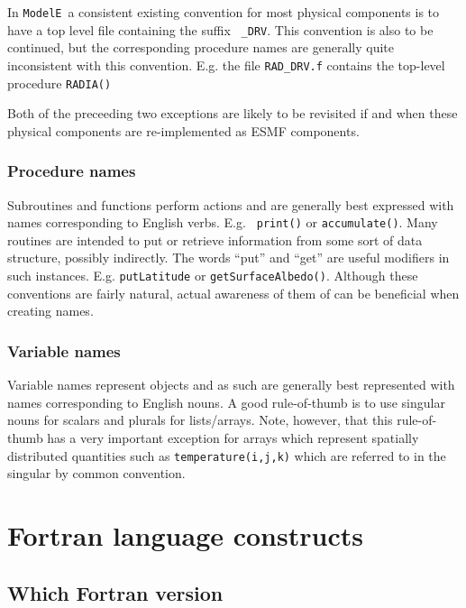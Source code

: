 \documentclass{article}
\newcommand{\ModelE}{{\tt ModelE}}
\begin{document}
In \ModelE~a consistent existing convention for most physical
components is to have a top level file containing the suffix {\tt
  \_DRV}.  This convention is also to be continued, but the
corresponding procedure names are generally quite inconsistent with
this convention.  E.g. the file {\tt RAD\_DRV.f} contains the top-level
procedure {\tt RADIA()}

Both of the preceeding two exceptions are likely to be revisited if
and when these physical components are re-implemented as ESMF
components.


\subsubsection {Procedure names}
Subroutines and functions perform actions and are generally best
expressed with names corresponding to English verbs.  E.g. {\tt
  print()} or {\tt accumulate()}.  Many routines are intended to put
or retrieve information from some sort of data structure, possibly
indirectly.  The words ``put'' and ``get'' are useful modifiers in
such instances.  E.g. {\tt putLatitude} or {\tt getSurfaceAlbedo()}.
Although these conventions are fairly natural, actual awareness of
them of can be beneficial when creating names.

\subsubsection {Variable names}
Variable names represent objects and as such are generally best
represented with names corresponding to English nouns.  A good
rule-of-thumb is to use singular nouns for scalars and plurals for
lists/arrays.  Note, however, that this rule-of-thumb has a very
important exception for arrays which represent spatially distributed
quantities such as {\tt temperature(i,j,k)} which are referred to in
the singular by common convention.

\section {Fortran language constructs}

\subsection {Which Fortran version}
\end{document}

